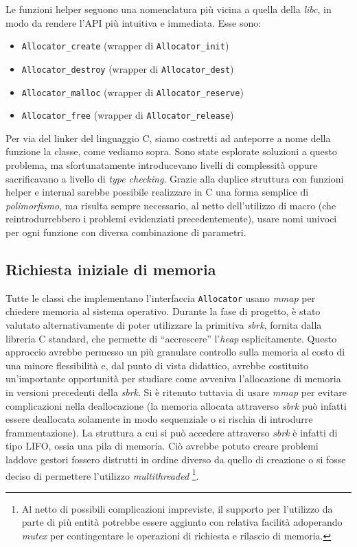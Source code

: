 Le funzioni helper seguono una nomenclatura più vicina a quella della \textit{libc}, in modo da rendere l’API più intuitiva e immediata. Esse sono:
\begin{itemize}
    \item \texttt{Allocator\_create} (wrapper di \texttt{Allocator\_init})
    \item \texttt{Allocator\_destroy} (wrapper di \texttt{Allocator\_dest})
    \item \texttt{Allocator\_malloc} (wrapper di \texttt{Allocator\_reserve})
    \item \texttt{Allocator\_free} (wrapper di \texttt{Allocator\_release})
\end{itemize}
Per via del linker del linguaggio C, siamo costretti ad anteporre a nome della funzione la classe, come vediamo sopra. Sono state esplorate soluzioni a questo problema, ma sfortunatamente introducevano livelli di complessità oppure sacrificavano a livello di \textit{type checking}. Grazie alla duplice struttura con funzioni helper e internal sarebbe possibile realizzare in C una forma semplice di \textit{polimorfismo}, ma risulta sempre necessario, al netto dell’utilizzo di macro (che reintrodurrebbero i problemi evidenziati precedentemente), usare nomi univoci per ogni funzione con diversa combinazione di parametri.

\subsection{Richiesta iniziale di memoria}
Tutte le classi che implementano l’interfaccia \texttt{Allocator} usano \textit{mmap} per chiedere memoria al sistema operativo. Durante la fase di progetto, è stato valutato alternativamente di poter utilizzare la primitiva \textit{sbrk}, fornita dalla libreria C standard, che permette di “accrescere” l’\textit{heap} esplicitamente. Questo approccio avrebbe permesso un più granulare controllo sulla memoria al costo di una minore flessibilità e, dal punto di vista didattico, avrebbe costituito un'importante opportunità per studiare come avveniva l’allocazione di memoria in versioni precedenti della \textit{sbrk}.
Si è ritenuto tuttavia di usare \textit{mmap} per evitare complicazioni nella deallocazione (la memoria allocata attraverso \textit{sbrk} può infatti essere deallocata solamente in modo sequenziale o si rischia di introdurre frammentazione). La struttura a cui si può accedere attraverso \textit{sbrk} è infatti di tipo LIFO, ossia una pila di memoria. Ciò avrebbe potuto creare problemi laddove gestori fossero distrutti in ordine diverso da quello di creazione o si fosse deciso di permettere l’utilizzo \textit{multithreaded} \footnote{Al netto di possibili complicazioni impreviste, il supporto per l'utilizzo da parte di più entità potrebbe essere aggiunto con relativa facilità adoperando \textit{mutex} per contingentare le operazioni di richiesta e rilascio di memoria.}.

